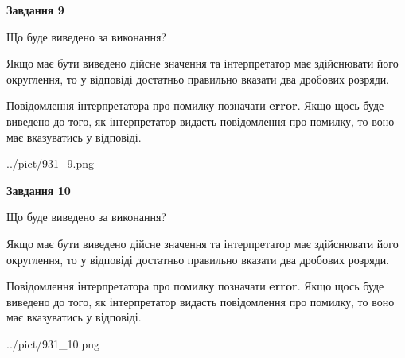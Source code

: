 \documentclass[12pt, ukrainian]{article}
\begin{document}
{\begin {Large}
{\begin {center}\textbf{Завдання 9}\end {center}}\par
Що буде виведено за виконання? \par

Якщо має бути виведено дійсне значення та інтерпретатор має здійснювати його округлення, 
то у відповіді достатньо правильно вказати два дробових розряди.

Повідомлення інтерпретатора про помилку позначати \textbf{error}.
Якщо щось буде виведено до того, як інтерпретатор видасть повідомлення про помилку, 
то воно має вказуватись у відповіді. \par

\begin{center}
	{../pict/931_9.png}
\end{center}
\newpage

{\begin {center}\textbf{Завдання 10}\end {center}}\par
Що буде виведено за виконання? \par

Якщо має бути виведено дійсне значення та інтерпретатор має здійснювати його округлення, 
то у відповіді достатньо правильно вказати два дробових розряди.

Повідомлення інтерпретатора про помилку позначати \textbf{error}.
Якщо щось буде виведено до того, як інтерпретатор видасть повідомлення про помилку, 
то воно має вказуватись у відповіді. \par

\begin{center}
	{../pict/931_10.png}
\end{center}
\newpage

\end {Large}}
\end{document}
